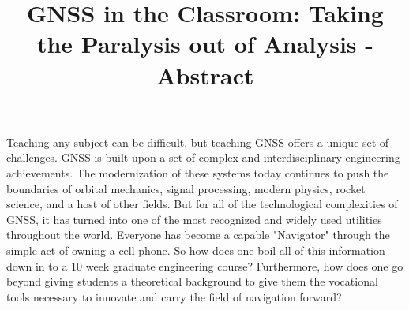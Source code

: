 \documentclass[12pt, conference, onecolumn, draftclsnofoot]{IEEEtran}
\begin{document}
\title{GNSS in the Classroom: Taking the Paralysis out of Analysis - Abstract}

\author{
\and
{}
\and
{}
\and
{}
}

\begin{singlespace}
    \maketitle 
\end{singlespace}

Teaching any subject can be difficult, but teaching GNSS offers a unique set of challenges.
GNSS is built upon a set of complex and interdisciplinary engineering achievements. 
The modernization of these systems today continues to push the boundaries of orbital mechanics, signal processing, modern physics, rocket science, and a host of other fields.
But for all of the technological complexities of GNSS, it has turned into one of the most recognized and widely used utilities throughout the world.
Everyone has become a capable "Navigator" through the simple act of owning a cell phone.
So how does one boil all of this information down in to a 10 week graduate engineering course?
Furthermore, how does one go beyond giving students a theoretical background to give them the vocational tools necessary to innovate and carry the field of navigation forward?
\end{document}
